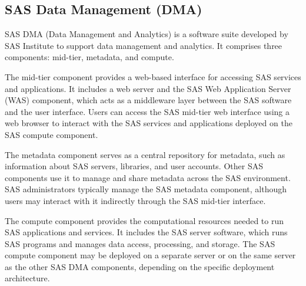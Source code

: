 \subsection{SAS Data Management (DMA)}
SAS DMA (Data Management and Analytics) is a software suite developed by SAS Institute to support data management and analytics. It comprises three components: mid-tier, metadata, and compute.

The mid-tier component provides a web-based interface for accessing SAS services and applications. It includes a web server and the SAS Web Application Server (WAS) component, which acts as a middleware layer between the SAS software and the user interface. Users can access the SAS mid-tier web interface using a web browser to interact with the SAS services and applications deployed on the SAS compute component.

The metadata component serves as a central repository for metadata, such as information about SAS servers, libraries, and user accounts. Other SAS components use it to manage and share metadata across the SAS environment. SAS administrators typically manage the SAS metadata component, although users may interact with it indirectly through the SAS mid-tier interface.

The compute component provides the computational resources needed to run SAS applications and services. It includes the SAS server software, which runs SAS programs and manages data access, processing, and storage. The SAS compute component may be deployed on a separate server or on the same server as the other SAS DMA components, depending on the specific deployment architecture.